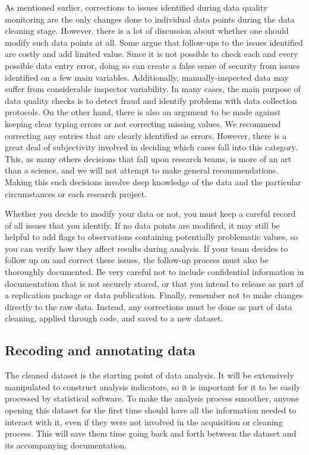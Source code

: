As mentioned earlier,
corrections to issues identified during data quality monitoring are
the only changes done to individual data points during the data cleaning stage.
However, there is a lot of discussion about whether one should modify such data points at all.
Some argue that follow-ups to the issues identified are costly and add limited value.
Since it is not possible to check each and every possible data entry error,
doing so can create a false sense of security from issues identified on a few main variables.
Additionally, manually-inspected data may suffer from considerable inspector variability.
In many cases, the main purpose of data quality checks
is to detect fraud and identify problems with data collection protocols.
On the other hand, there is also an argument to be made
against keeping clear typing errors or not correcting missing values.
We recommend correcting any entries that are clearly identified as errors.
However, there is a great deal of subjectivity involved in deciding
which cases fall into this category.
This, as many others decisions that fall upon research teams,
is more of an art than a science, and
we will not attempt to make general recommendations.
Making this such decisions involve deep knowledge of the data and
the particular circumstances or each research project.


Whether you decide to modify your data or not,
you must keep a careful record of all issues that you identify.
If no data points are modified,
it may still be helpful to add flags to observations containing
potentially problematic values,
so you can verify how they affect results during analysis.
If your team decides to follow up on and correct these issues,
the follow-up process must also be thoroughly documented.
Be very careful not to include confidential information in documentation that is not securely stored,
or that you intend to release as part of a replication package or data publication.
Finally, remember not to make changes directly to the raw data.
Instead, any corrections must be done as part of data cleaning,
applied through code, and saved to a new dataset.

\subsection{Recoding and annotating data}

The cleaned dataset is the starting point of data analysis.
It will be extensively manipulated to construct analysis indicators,
so it is important for it to be easily processed by statistical software.
To make the analysis process smoother,
anyone opening this dataset for the first time should have all the information needed to interact with it,
even if they were not involved in the acquisition or cleaning process.
This will save them time going back and forth between the dataset and its accompanying documentation.

